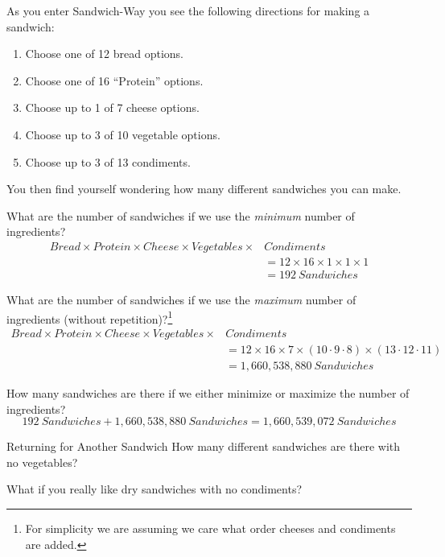 \begin{exposition}
    As you enter Sandwich-Way you see the following directions for making a sandwich:
    \begin{enumerate}
        \item Choose one of 12 bread options.
        \item Choose one of 16 ``Protein'' options.
        \item Choose up to 1 of 7 cheese options.
        \item Choose up to 3 of 10 vegetable options.
        \item Choose up to 3 of 13 condiments.
    \end{enumerate}
    You then find yourself wondering how many different sandwiches you can make.

    \noindent%
    What are the number of sandwiches if we use the \emph{minimum} number of ingredients?
    \begin{align*}
        Bread\times Protein\times Cheese\times Vegetables\times &Condiments\\
            &= 12\times 16\times 1\times 1\times 1\\
            &= 192\ Sandwiches
    \end{align*}

    \noindent%
    What are the number of sandwiches if we use the \emph{maximum} number of ingredients (without repetition)?\footnote{For simplicity we are assuming we care what order cheeses and condiments are added.}
    \begin{align*}
        Bread\times Protein\times Cheese\times Vegetables\times &Condiments\\
            &= 12\times 16\times 7\times (10\cdot9\cdot8)\times (13\cdot12\cdot11)\\
            &= 1,660,538,880\ Sandwiches
    \end{align*}

    \noindent%
    How many sandwiches are there if we either minimize or maximize the number of ingredients?
    \[192\ Sandwiches+1,660,538,880\ Sandwiches=1,660,539,072\ Sandwiches\]
\end{exposition}


\begin{practiceprob}{Returning for Another Sandwich}
    How many different sandwiches are there with no vegetables?\vspace{0.1\textheight}

    What if you really like dry sandwiches with no condiments?\vspace{0.1\textheight}

\end{practiceprob}



